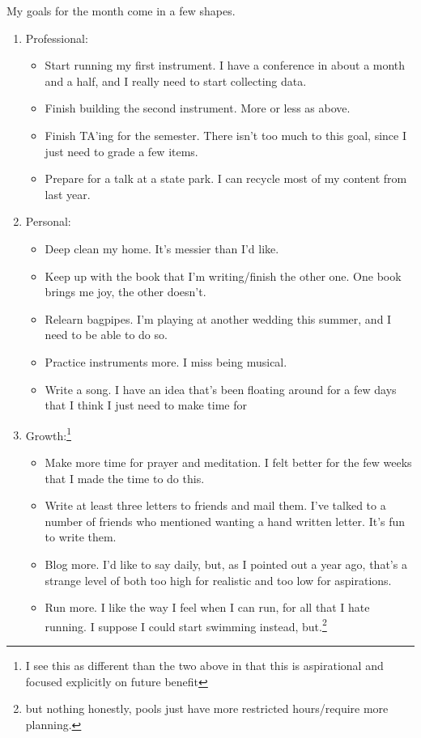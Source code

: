 \documentclass[12pt]{article}[titlepage]
\renewcommand{\,}{\textsuperscript{,}}
\begin{document}
My goals for the month come in a few shapes.
\begin{enumerate}
\item Professional:
\begin{itemize}
\item Start running my first instrument. I have a conference in about a month and a half, and I really need to start collecting data.
\item Finish building the second instrument. More or less as above.
\item Finish TA'ing for the semester. There isn't too much to this goal, since I just need to grade a few items.
\item Prepare for a talk at a state park. I can recycle most of my content from last year.
\end{itemize}
\item Personal:
\begin{itemize}
\item Deep clean my home. It's messier than I'd like.
\item Keep up with the book that I'm writing/finish the other one. One book brings me joy, the other doesn't.
\item Relearn bagpipes. I'm playing at another wedding this summer, and I need to be able to do so.
\item Practice instruments more. I miss being musical.
\item Write a song. I have an idea that's been floating around for a few days that I think I just need to make time for
\end{itemize}
\item Growth:\footnote{I see this as different than the two above in that this is aspirational and focused explicitly on future benefit}
\begin{itemize}
\item Make more time for prayer and meditation. I felt better for the few weeks that I made the time to do this.
\item Write at least three letters to friends and mail them. I've talked to a number of friends who mentioned wanting a hand written letter. It's fun to write them.
\item Blog more. I'd like to say daily, but, as I pointed out a year ago, that's a strange level of both too high for realistic and too low for aspirations.
\item Run more. I like the way I feel when I can run, for all that I hate running. I suppose I could start swimming instead, but.\footnote{but nothing honestly, pools just have more restricted hours/require more planning.}

\end{itemize}
\end{enumerate}
\end{document}
